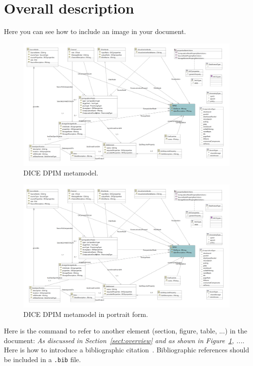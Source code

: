 \section{Overall description}
Here you can see how to include an image in your document.

\begin{figure}
\centering
\includegraphics[width=\textwidth]{Images/11.png}
\caption{\label{fig:metamodel}DICE DPIM metamodel.}
\end{figure}

\begin{figure}
\centering
\includegraphics[width=\textwidth]{Images/11.png}
\caption{\label{fig:metamodel2}DICE DPIM metamodel in portrait form.}
\end{figure}

Here is the command to refer to another element (section, figure, table, ...) in the document: \emph{As discussed in Section~\ref{sect:overview} and as shown in Figure~\ref{fig:metamodel}, ...}. Here is how to introduce a bibliographic citation~\cite{DAM}. Bibliographic references should be included in a \texttt{.bib} file. 

